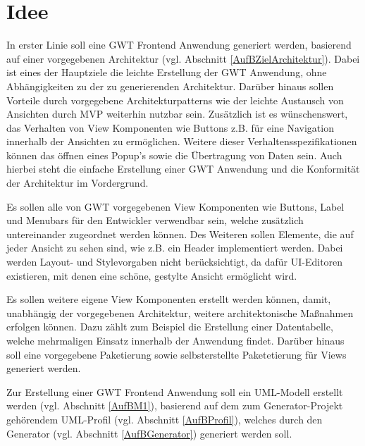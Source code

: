 \chapter{Idee}
\label{Idee}
In erster Linie soll eine GWT Frontend Anwendung generiert werden, basierend auf
einer vorgegebenen Architektur (vgl. Abschnitt \ref{AufBZielArchitektur}). Dabei
ist eines der Hauptziele die leichte Erstellung der GWT Anwendung, ohne
Abhängigkeiten zu der zu generierenden Architektur. Darüber hinaus sollen
Vorteile durch vorgegebene Architekturpatterns wie der leichte Austausch von
Ansichten durch MVP weiterhin nutzbar sein. Zusätzlich ist es wünschenswert, das
Verhalten von View Komponenten wie Buttons z.B. für eine Navigation innerhalb
der Ansichten zu ermöglichen. Weitere dieser Verhaltensspezifikationen können
das öffnen eines Popup's sowie die Übertragung von Daten sein. Auch hierbei
steht die einfache Erstellung einer GWT Anwendung und die Konformität
der Architektur im Vordergrund.

Es sollen alle von GWT vorgegebenen View Komponenten wie Buttons, Label und
Menubars für den Entwickler verwendbar sein, welche zusätzlich
untereinander zugeordnet werden können. Des Weiteren sollen Elemente, die auf
jeder Ansicht zu sehen sind, wie z.B. ein Header implementiert werden. Dabei
werden Layout- und Stylevorgaben nicht berücksichtigt, da dafür UI-Editoren
existieren, mit denen eine \grqq{}schöne, gestylte\grqq{} Ansicht ermöglicht wird.

Es sollen weitere eigene View Komponenten erstellt werden können, damit,
unabhängig der vorgegebenen Architektur, weitere architektonische Maßnahmen
erfolgen können. Dazu zählt zum Beispiel die Erstellung einer Datentabelle,
welche mehrmaligen Einsatz innerhalb der Anwendung findet. Darüber hinaus soll
eine vorgegebene Paketierung sowie selbsterstellte Paketetierung für Views
generiert werden.

Zur Erstellung einer GWT Frontend Anwendung soll ein UML-Modell
erstellt werden (vgl. Abschnitt \ref{AufBM1}), basierend auf dem zum
Generator-Projekt gehörendem UML-Profil (vgl. Abschnitt \ref{AufBProfil}),
welches durch den Generator (vgl. Abschnitt \ref{AufBGenerator}) generiert
werden soll.

